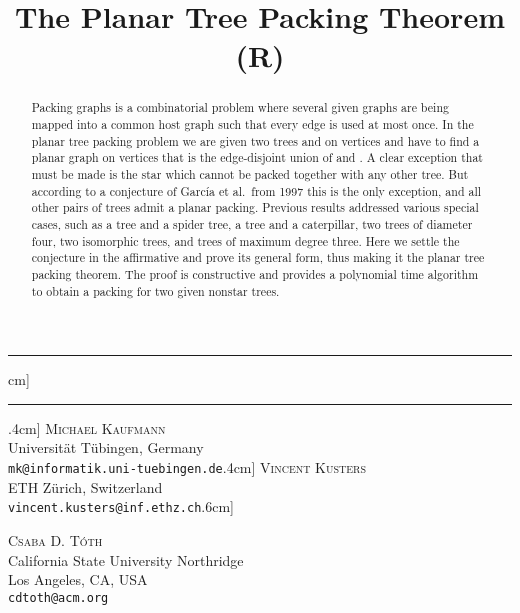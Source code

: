 \documentclass[11pt,a4paper,colorlinks=true,urlcolor=blue,citecolor=red]{article}
\title{The Planar Tree Packing Theorem ({R\svnInfoRevision})}
\theoremstyle{plain}
\newcommand{\HRule}{\rule{\linewidth}{0.5mm}}
\begin{document}
\begin{titlepage}
  \begin{center}
    \HRule \0cm]
    \HRule \0.4cm]
        \large
        \textsc{Michael Kaufmann}\\
        \small
Universit\"{a}t T\"{u}bingen, Germany\\
        \verb|mk@informatik.uni-tuebingen.de|\0.4cm]
        \large
        \textsc{Vincent Kusters}\\
        \small ETH Z\"{u}rich, Switzerland\\
        \verb|vincent.kusters@inf.ethz.ch|\0.6cm]
    \begin{minipage}{0.45\textwidth}
      \begin{center} \large
        \textsc{Csaba D. T\'oth}\\
        \small \small California State University Northridge\\ Los
        Angeles, CA, USA\\
        \verb|cdtoth@acm.org|
      \end{center}
    \end{minipage}
  \end{center}

  \vspace{\baselineskip}

  \begin{center}
    {\large \svnToday}
  \end{center}

  \vspace{\baselineskip}

  \begin{abstract}
    Packing graphs is a combinatorial problem where several given graphs
    are being mapped into a common host graph such that every edge is
    used at most once. In the planar tree packing problem we are given
    two trees  and  on  vertices and have to find a planar
    graph on  vertices that is the edge-disjoint union of  and
    . A clear exception that must be made is the star which cannot
    be packed together with any other tree. But according to a
    conjecture of Garc\'ia et al.\ from 1997 this is the only exception,
    and all other pairs of trees admit a planar packing. Previous
    results addressed various special cases, such as a tree and a spider
    tree, a tree and a caterpillar, two trees of diameter four, two
    isomorphic trees, and trees of maximum degree three. Here we settle
    the conjecture in the affirmative and prove its general form, thus
    making it the planar tree packing theorem. The proof is constructive
    and provides a polynomial time algorithm to obtain a packing for two
    given nonstar trees.
\end{abstract}


\end{titlepage}
\end{document}
